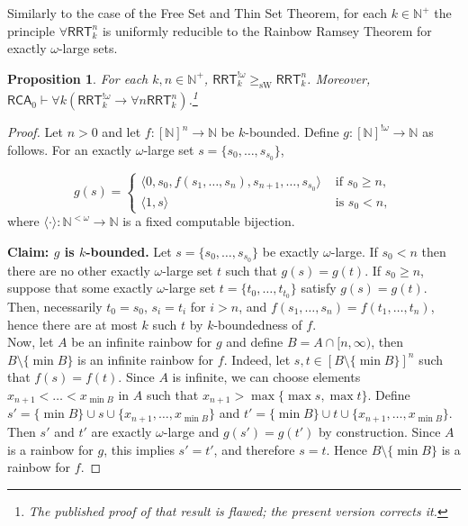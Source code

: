 \documentclass[10pt,a4paper]{article}
\newcommand{\RCA}[0]{\mathsf{RCA}}
\newcommand{\RRT}[0]{\mathsf{RRT}}
\newcommand{\NN}[0]{\mathbb{N}}
\newcommand{\sW}{\mathrm{sW}}
\numberwithin{theorem}{section}
\newtheorem{proposition}[theorem]{Proposition}
\begin{document}
Similarly to the case of the Free Set and Thin Set Theorem, for each $k\in\NN^+$ the principle $\forall \RRT^n_k$ is uniformly reducible to the Rainbow Ramsey Theorem for 
exactly $\omega$-large sets. 
\fi

\begin{proposition}
For each $k, n\in\NN^+$, $\RRT^{!\omega}_k \geq_\sW \RRT^n_k$.
Moreover, $\RCA_0 \vdash \forall k (\RRT^{!\omega}_k \to \forall n \RRT^n_k)$.\footnote{The published proof \cite{carlucci2025ramsey} of that result is flawed; the present version corrects it.}
\end{proposition}

\begin{proof}
Let $n > 0$ and let $f:[\NN]^n \to \NN$ be $k$-bounded. Define $g:[\NN]^{!\omega}\to \NN$ as follows. For an exactly $\omega$-large set $s = \{s_0, \dots, s_{s_0}\}$,

$$
g(s)=
\begin{cases}
\langle 0, s_0, f(s_1, \dots, s_n), s_{n+1}, \dots, s_{s_0} \rangle & \mbox{ if } s_0 \geq n,\\
\langle 1, s \rangle & \mbox{ is } s_0 < n,
\end{cases}
$$
where $\langle \cdot \rangle : \NN^{<\omega} \to \NN$ is a fixed computable bijection.

\textbf{Claim: $g$ is $k$-bounded.} Let $s = \{s_0, \dots, s_{s_0}\}$ be exactly $\omega$-large. If $s_0 < n$ then there are no other exactly $\omega$-large set $t$ such that $g(s) = g(t)$. If $s_0 \geq n$, suppose that some exactly $\omega$-large set $t = \{t_0, \dots, t_{t_0}\}$ satisfy $g(s) = g(t)$. Then, necessarily $t_0 = s_0$, $s_i = t_i$ for $i > n$, and $f(s_1, \dots, s_n) = f(t_1, \dots, t_n)$, hence there are at most $k$ such $t$ by $k$-boundedness of $f$. \\


Now, let $A$ be an infinite rainbow for $g$ and define $B = A \cap [n, \infty)$, then $B \setminus \{\min B\}$ is an infinite rainbow for $f$. Indeed, let $s,t \in [B \setminus \{\min B\}]^n$ such that $f(s) = f(t)$. Since $A$ is infinite, we can choose elements $x_{n+1} < \dots < x_{\min B}$ in $A$ such that $x_{n+1} > \max \{\max s, \max t\}$. Define $s' = \{\min B\} \cup s \cup \{x_{n+1}, \dots, x_{\min B}\}$ and $t' = \{\min B\} \cup t \cup \{x_{n+1}, \dots, x_{\min B}\}$. Then $s'$ and $t'$ are exactly $\omega$-large and $g(s') = g(t')$ by construction. Since $A$ is a rainbow for $g$, this implies $s' = t'$, and therefore $s = t$. Hence $B \setminus \{\min B\}$ is a rainbow for $f$.
\end{proof}
\end{document}
